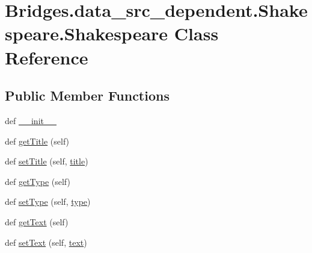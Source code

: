 \hypertarget{class_bridges_1_1data__src__dependent_1_1_shakespeare_1_1_shakespeare}{}\section{Bridges.\+data\+\_\+src\+\_\+dependent.\+Shakespeare.\+Shakespeare Class Reference}
\label{class_bridges_1_1data__src__dependent_1_1_shakespeare_1_1_shakespeare}
\subsection*{Public Member Functions}
\begin{DoxyCompactItemize}
\item 
def \hyperlink{class_bridges_1_1data__src__dependent_1_1_shakespeare_1_1_shakespeare_a0e2f52b96413988c68897692c2929e52}{\+\_\+\+\_\+init\+\_\+\+\_\+}
\item 
def \hyperlink{class_bridges_1_1data__src__dependent_1_1_shakespeare_1_1_shakespeare_afd1347da7f477b74d0f965900df954f9}{get\+Title} (self)
\item 
def \hyperlink{class_bridges_1_1data__src__dependent_1_1_shakespeare_1_1_shakespeare_a75128703883a2d0a027cd78a5c967097}{set\+Title} (self, \hyperlink{class_bridges_1_1data__src__dependent_1_1_shakespeare_1_1_shakespeare_ac3970c59e0d01f6d8a7037cd129a4c7d}{title})
\item 
def \hyperlink{class_bridges_1_1data__src__dependent_1_1_shakespeare_1_1_shakespeare_aed6684c50c9c749f82db13d29943c858}{get\+Type} (self)
\item 
def \hyperlink{class_bridges_1_1data__src__dependent_1_1_shakespeare_1_1_shakespeare_ac75d4d9faf0378040b79039f08855428}{set\+Type} (self, \hyperlink{class_bridges_1_1data__src__dependent_1_1_shakespeare_1_1_shakespeare_ab841234a24c7982c99bb69ebe29cd17a}{type})
\item 
def \hyperlink{class_bridges_1_1data__src__dependent_1_1_shakespeare_1_1_shakespeare_a30f68eb252dbf6c067bfe808310936f6}{get\+Text} (self)
\item 
def \hyperlink{class_bridges_1_1data__src__dependent_1_1_shakespeare_1_1_shakespeare_ac6a6bb66301879cd4503f6d01b7a2bc9}{set\+Text} (self, \hyperlink{class_bridges_1_1data__src__dependent_1_1_shakespeare_1_1_shakespeare_aca881efeb7708645e304bedd8bfdfbb1}{text})
\end{DoxyCompactItemize}
